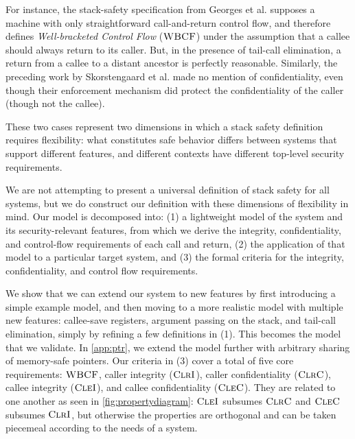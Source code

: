 \documentclass[10pt,conference]{ieeetran}%
\theoremstyle{definition}
\begin{document}
For instance, the stack-safety specification from Georges et al.
\cite{Georges22:TempsDesCerises} supposes a machine with only straightforward call-and-return
control flow, and therefore defines {\em Well-bracketed Control Flow} (\(\textnormal{\sc WBCF}\)) under the assumption that
a callee should always return to its caller. But, in the presence of tail-call elimination, a
return from a callee to a distant ancestor is perfectly reasonable. Similarly, the preceding work by
Skorstengaard et al. \cite{SkorstengaardSTKJFP} made no mention of confidentiality, even though
their enforcement mechanism did protect the confidentiality of the caller (though not the callee).

These two cases represent two dimensions in which a stack safety definition requires
flexibility: what constitutes safe behavior differs between systems that support different
features, and different contexts have different top-level security requirements.

We are not attempting to present a universal definition of stack safety for all systems,
but we do construct our definition with these dimensions of flexibility in mind.
Our model is decomposed into:
(1) a lightweight model of the system and its security-relevant features, from which we
derive the integrity, confidentiality, and control-flow requirements of each call and
return, (2) the application of that model to a particular target system, and (3)
the formal criteria for the integrity, confidentiality, and control flow
requirements.

We show that we can extend our system to new features by first introducing a simple
example model, and then moving to a more realistic model with multiple new features:
callee-save registers, argument passing on the stack, and tail-call elimination, simply
by refining a few definitions in (1). This becomes the model that we validate.
In \cref{app:ptr}, we extend the model further with arbitrary sharing of memory-safe
pointers. Our criteria in (3) cover a total of five core requirements:
\(\textnormal{\sc WBCF}\), caller integrity (\(\textnormal{\sc ClrI}\)), caller confidentiality (\(\textnormal{\sc ClrC}\)),
callee integrity (\(\textnormal{\sc CleI}\)), and callee confidentiality (\(\textnormal{\sc CleC}\)).
They are related to one another as seen in
\cref{fig:propertydiagram}: \(\textnormal{\sc CleI}\) subsumes \(\textnormal{\sc ClrC}\) and \(\textnormal{\sc CleC}\) subsumes
\(\textnormal{\sc ClrI}\), but otherwise the properties are orthogonal and can be taken piecemeal
according to the needs of a system.
\end{document}
